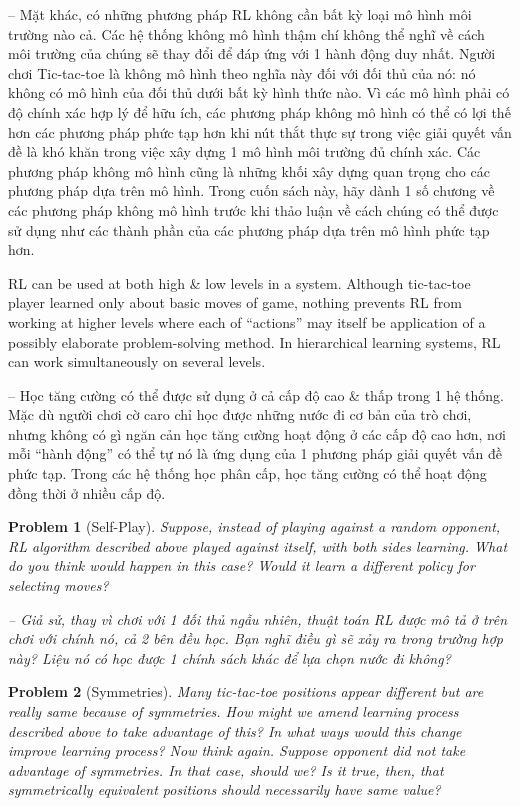 \documentclass{article}
\newtheorem{problem}{Problem}
\begin{document}
\begin{itemize}
\begin{itemize}
        -- Mặt khác, có những phương pháp RL không cần bất kỳ loại mô hình môi trường nào cả. Các hệ thống không mô hình thậm chí không thể nghĩ về cách môi trường của chúng sẽ thay đổi để đáp ứng với 1 hành động duy nhất. Người chơi Tic-tac-toe là không mô hình theo nghĩa này đối với đối thủ của nó: nó không có mô hình của đối thủ dưới bất kỳ hình thức nào. Vì các mô hình phải có độ chính xác hợp lý để hữu ích, các phương pháp không mô hình có thể có lợi thế hơn các phương pháp phức tạp hơn khi nút thắt thực sự trong việc giải quyết vấn đề là khó khăn trong việc xây dựng 1 mô hình môi trường đủ chính xác. Các phương pháp không mô hình cũng là những khối xây dựng quan trọng cho các phương pháp dựa trên mô hình. Trong cuốn sách này, hãy dành 1 số chương về các phương pháp không mô hình trước khi thảo luận về cách chúng có thể được sử dụng như các thành phần của các phương pháp dựa trên mô hình phức tạp hơn.

        RL can be used at both high \& low levels in a system. Although tic-tac-toe player learned only about basic moves of game, nothing prevents RL from working at higher levels where each of ``actions'' may itself be application of a possibly elaborate problem-solving method. In hierarchical learning systems, RL can work simultaneously on several levels.

        -- Học tăng cường có thể được sử dụng ở cả cấp độ cao \& thấp trong 1 hệ thống. Mặc dù người chơi cờ caro chỉ học được những nước đi cơ bản của trò chơi, nhưng không có gì ngăn cản học tăng cường hoạt động ở các cấp độ cao hơn, nơi mỗi ``hành động'' có thể tự nó là ứng dụng của 1 phương pháp giải quyết vấn đề phức tạp. Trong các hệ thống học phân cấp, học tăng cường có thể hoạt động đồng thời ở nhiều cấp độ.

        \begin{problem}[Self-Play]
            Suppose, instead of playing against a random opponent, RL algorithm described above played against itself, with both sides learning. What do you think would happen in this case? Would it learn a different policy for selecting moves?

            -- Giả sử, thay vì chơi với 1 đối thủ ngẫu nhiên, thuật toán RL được mô tả ở trên chơi với chính nó, cả 2 bên đều học. Bạn nghĩ điều gì sẽ xảy ra trong trường hợp này? Liệu nó có học được 1 chính sách khác để lựa chọn nước đi không?
        \end{problem}

        \begin{problem}[Symmetries]
            Many tic-tac-toe positions appear different but are really same because of symmetries. How might we amend learning process described above to take advantage of this? In what ways would this change improve learning process? Now think again. Suppose opponent did not take advantage of symmetries. In that case, should we? Is it true, then, that symmetrically equivalent positions should necessarily have same value?


\end{problem}
\end{itemize}
\end{itemize}
\end{document}
